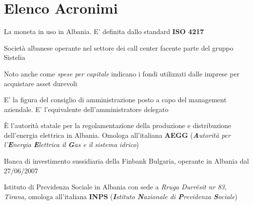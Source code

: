 \section*{Elenco Acronimi}
\begin{acronym}
\begin{multicols}{2}

		   {\newline \small La moneta in uso in Albania. E' definita dallo standard \textbf{ISO 4217}  \par}

		   {\newline \small Società albanese operante nel settore dei call center facente parte del gruppo Sistelia \par}

		   {\newline \small Noto anche come \textit{spese per capitale} indicano i fondi utilizzati dalle imprese per acquistare asset durevoli  \par}

		   {\newline \small E' la figura del consiglio di amministrazione posto a capo del management aziendale. E' l'equivalente dell'amministratore delegato  \par}

		   {\newline \small \`E l'autorità statale per la regolamentazione della produzione e distribuzione dell'energia elettrica in Albania\cite{ere_albania}. Omologa all'italiana \textbf{AEGG} (\textit{\textbf{A}utorità per l'\textbf{E}nergia \textbf{E}lettrica il \textbf{G}as e il sistema idrico})\cite{aeeg_ita} \par}

		   {\newline \small Banca di investimento sussidiaria della Finbank Bulgaria, operante in Albania dal 27/06/2007\cite{finbank_al} \par}

		   {\newline \small Istituto di Previdenza Sociale in Albania con sede a \textit{Rruga Durr\"esit nr 83, Tirana}\cite{issh_albania}, omologa all'italiana \textbf{INPS} (\textit{\textbf{I}stituto \textbf{N}azionale di \textbf{P}revidenza \textbf{S}ociale})\cite{inps_italia}\par}


\end{multicols}
\end{acronym}
